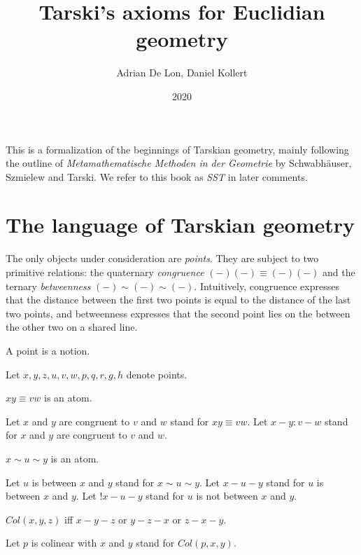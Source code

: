 \documentclass{article}
\title{Tarski's axioms for Euclidian geometry}
\author{Adrian De Lon, Daniel Kollert}
\date{2020}
\newcommand{\Cong}[4]{#1 #2 \equiv #3 #4}
\newcommand{\Betw}[3]{#1 {\sim} #2 {\sim} #3}
\begin{document}

  \maketitle

  This is a formalization of the beginnings of Tarskian geometry,
  mainly following the outline of \textit{Metamathematische Methoden in der Geometrie} by
  Schwabhäuser, Szmielew and Tarski.
  We refer to this book as \textit{SST} in later comments.

  \section{The language of Tarskian geometry}

  The only objects under consideration are \textit{points}.
  They are subject to two primitive relations:
  the quaternary \textit{congruence} $\Cong{(-)}{(-)}{(-)}{(-)}$
  and the ternary \textit{betweenness} $\Betw{(-)}{(-)}{(-)}$.
  Intuitively, congruence expresses that the distance between the first two points is equal to the distance of the last two points, and betweenness expresses that
  the second point lies on the between the other two on a shared line.


  \begin{forthel}

    \begin{signature}
      A point is a notion.
    \end{signature}

    Let $x, y, z, u, v, w, p, q, r, g, h$ denote points.


    \begin{signature}
      $\Cong{x}{y}{v}{w}$ is an atom.
    \end{signature}

    Let $x$ and $y$ are congruent to $v$ and $w$ stand for $\Cong{x}{y}{v}{w}$.
    Let $x-y : v-w$ stand for $x$ and $y$ are congruent to $v$ and $w$.

    \begin{signature}
      $\Betw{x}{u}{y}$ is an atom.
    \end{signature}

    Let $u$ is between $x$ and $y$ stand for $\Betw{x}{u}{y}$.
    Let $x-u-y$ stand for $u$ is between $x$ and $y$.
    Let $!x-u-y$ stand for $u$ is not between $x$ and $y$.


    \begin{definition}
      $Col(x,y,z)$ iff $x-y-z$ or $y-z-x$ or $z-x-y$.
    \end{definition}

    Let $p$ is colinear with $x$ and $y$ stand for $Col(p,x,y)$.
  \end{forthel}
\end{document}
